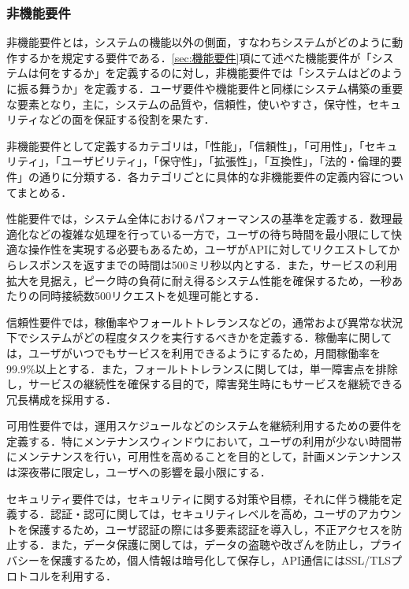       \subsubsection{非機能要件}
        \label{sec:非機能要件}
          \par 非機能要件とは，システムの機能以外の側面，すなわちシステムがどのように動作するかを規定する要件である．\ref{sec:機能要件}項にて述べた機能要件が「システムは何をするか」を定義するのに対し，非機能要件では「システムはどのように振る舞うか」を定義する．ユーザ要件や機能要件と同様にシステム構築の重要な要素となり，主に，システムの品質や，信頼性，使いやすさ，保守性，セキュリティなどの面を保証する役割を果たす．
          \par 非機能要件として定義するカテゴリは，「性能」，「信頼性」，「可用性」，「セキュリティ」，「ユーザビリティ」，「保守性」，「拡張性」，「互換性」，「法的・倫理的要件」の通りに分類する．各カテゴリごとに具体的な非機能要件の定義内容についてまとめる．
          \par 性能要件では，システム全体におけるパフォーマンスの基準を定義する．数理最適化などの複雑な処理を行っている一方で，ユーザの待ち時間を最小限にして快適な操作性を実現する必要もあるため，ユーザがAPIに対してリクエストしてからレスポンスを返すまでの時間は500ミリ秒以内とする．また，サービスの利用拡大を見据え，ピーク時の負荷に耐え得るシステム性能を確保するため，一秒あたりの同時接続数500リクエストを処理可能とする．
          \par 信頼性要件では，稼働率やフォールトトレランスなどの，通常および異常な状況下でシステムがどの程度タスクを実行するべきかを定義する．稼働率に関しては，ユーザがいつでもサービスを利用できるようにするため，月間稼働率を99.9\%以上とする．また，フォールトトレランスに関しては，単一障害点を排除し，サービスの継続性を確保する目的で，障害発生時にもサービスを継続できる冗長構成を採用する．
          \par 可用性要件では，運用スケジュールなどのシステムを継続利用するための要件を定義する．特にメンテナンスウィンドウにおいて，ユーザの利用が少ない時間帯にメンテナンスを行い，可用性を高めることを目的として，計画メンテンナンスは深夜帯に限定し，ユーザへの影響を最小限にする．
          \par セキュリティ要件では，セキュリティに関する対策や目標，それに伴う機能を定義する．認証・認可に関しては，セキュリティレベルを高め，ユーザのアカウントを保護するため，ユーザ認証の際には多要素認証を導入し，不正アクセスを防止する．また，データ保護に関しては，データの盗聴や改ざんを防止し，プライバシーを保護するため，個人情報は暗号化して保存し，API通信にはSSL/TLSプロトコルを利用する．

